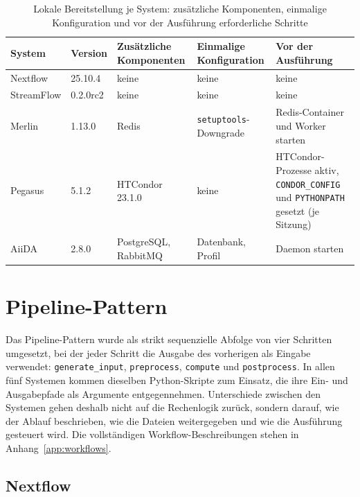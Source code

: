 \begin{table}[ht]
  \caption{Lokale Bereitstellung je System: zusätzliche Komponenten, einmalige Konfiguration und vor der Ausführung erforderliche Schritte}
  \label{tab:lokal:dienste}
  \centering
  \footnotesize
  \renewcommand{\arraystretch}{1.3}
  \begin{tabular}{l l p{2.6cm} p{3.0cm} p{3.4cm}}
    \hline
    \textbf{System} & \textbf{Version} & \textbf{Zusätzliche Komponenten} & \textbf{Einmalige Konfiguration} & \textbf{Vor der Ausführung} \\
    \hline
    Nextflow   & 25.10.4  & keine & keine & keine \\
    StreamFlow & 0.2.0rc2 & keine & keine & keine \\
    Merlin     & 1.13.0   & Redis & \texttt{setuptools}-Downgrade & Redis-Container und Worker starten \\
    Pegasus    & 5.1.2    & HTCondor 23.1.0 & keine & HTCondor-Prozesse aktiv, \texttt{CONDOR\_CONFIG} und \texttt{PYTHONPATH} gesetzt (je Sitzung) \\
    AiiDA      & 2.8.0    & PostgreSQL, RabbitMQ & Datenbank, Profil & Daemon starten \\
    \hline
  \end{tabular}
\end{table}

\section{Pipeline-Pattern}
\label{sec:lokal:pipeline}

Das Pipeline-Pattern wurde als strikt sequenzielle Abfolge von vier
Schritten umgesetzt, bei der jeder Schritt die Ausgabe des vorherigen
als Eingabe verwendet: \texttt{generate\_input}, \texttt{preprocess},
\texttt{compute} und \texttt{postprocess}. In allen fünf Systemen
kommen dieselben Python-Skripte zum Einsatz, die ihre Ein- und
Ausgabepfade als Argumente entgegennehmen. Unterschiede zwischen den
Systemen gehen deshalb nicht auf die Rechenlogik zurück, sondern
darauf, wie der Ablauf beschrieben, wie die Dateien weitergegeben und
wie die Ausführung gesteuert wird. Die vollständigen
Workflow-Beschreibungen stehen in Anhang~\ref{app:workflows}.

\subsection{Nextflow}
\label{sec:lokal:pipeline:nextflow}


